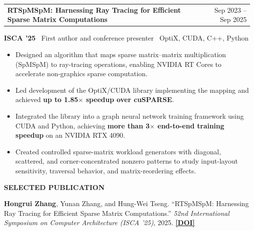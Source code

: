 \documentclass[11pt]{article}
\makeatletter
\newcommand{\resheading}[1]{%
  \par\addvspace{10pt}%
  \noindent\colorbox{sectiongray}{%
    \parbox{\dimexpr\linewidth-2\fboxsep\relax}{\strut\small\textbf{#1}}%
  }\par\nobreak\vspace{4pt}\nopagebreak[4]%
}
\newcommand{\resumeentry}[3]{%
  \par\addvspace{6pt}%
  \begin{tabularx}{\linewidth}{@{}>{\raggedright\arraybackslash}X@{\hspace{1em}}r@{}}%
    \textbf{#1} & {\small #2}\\%
  \end{tabularx}\par\nobreak%
  {\small #3\par}\nobreak\nopagebreak[4]%
}
\makeatother
\begin{document}
\resumeentry{RTSpMSpM: Harnessing Ray Tracing for Efficient Sparse Matrix Computations}
  {Sep 2023 -- Sep 2025}
  {\textbf{ISCA '25} \textbar\ First author and conference presenter \textbar\ OptiX, CUDA, C++, Python}
\begin{itemize}
  \item Designed an algorithm that maps sparse matrix--matrix multiplication (SpMSpM) to ray-tracing operations, enabling NVIDIA RT Cores to accelerate non-graphics sparse computation.
  \item Led development of the OptiX/CUDA library implementing the mapping and achieved \textbf{up to 1.85$\times$ speedup over cuSPARSE}.
  \item Integrated the library into a graph neural network training framework using CUDA and Python, achieving \textbf{more than 3$\times$ end-to-end training speedup} on an NVIDIA RTX 4090.
  \item Created controlled sparse-matrix workload generators with diagonal, scattered, and corner-concentrated nonzero patterns to study input-layout sensitivity, traversal behavior, and matrix-reordering effects.
\end{itemize}


\resheading{SELECTED PUBLICATION}
\textbf{Hongrui Zhang}, Yunan Zhang, and Hung-Wei Tseng.
``RTSpMSpM: Harnessing Ray Tracing for Efficient Sparse Matrix Computations.''
\textit{52nd International Symposium on Computer Architecture (ISCA '25)}, 2025.
\href{https://doi.org/10.1145/3695053.3731072}{\textbf{[DOI]}}
\end{document}
